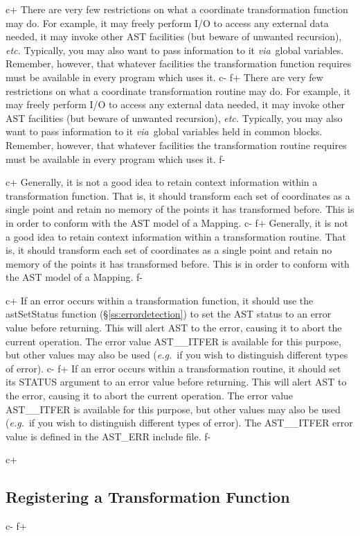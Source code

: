 \documentclass[twoside,11pt]{article}
\newcommand{\secref}[1]{\S\ref{#1}}
\newcommand{\secref}[1]{\ref{#1}}
\begin{document}
c+
There are very few restrictions on what a coordinate transformation
function may do. For example, it may freely perform I/O to access any
external data needed, it may invoke other AST facilities (but beware
of unwanted recursion), {\em{etc.}} Typically, you may also want to
pass information to it {\em{via}}\ global variables. Remember,
however, that whatever facilities the transformation function requires
must be available in every program which uses it.
c-
f+
There are very few restrictions on what a coordinate transformation
routine may do. For example, it may freely perform I/O to access any
external data needed, it may invoke other AST facilities (but beware
of unwanted recursion), {\em{etc.}} Typically, you may also want to
pass information to it {\em{via}}\ global variables held in common
blocks.  Remember, however, that whatever facilities the
transformation routine requires must be available in every program
which uses it.
f-

c+
Generally, it is not a good idea to retain context information within
a transformation function. That is, it should transform each set of
coordinates as a single point and retain no memory of the points it
has transformed before. This is in order to conform with the AST model
of a Mapping.
c-
f+
Generally, it is not a good idea to retain context information within
a transformation routine. That is, it should transform each set of
coordinates as a single point and retain no memory of the points it
has transformed before. This is in order to conform with the AST model
of a Mapping.
f-

c+
If an error occurs within a transformation function, it should use the
astSetStatus function (\secref{ss:errordetection}) to set the AST
status to an error value before returning. This will alert AST to the
error, causing it to abort the current operation. The error value
AST\_\_ITFER is available for this purpose, but other values may also
be used ({\em{e.g.}}\ if you wish to distinguish different types of
error).
c-
f+
If an error occurs within a transformation routine, it should set its
STATUS argument to an error value before returning. This will alert
AST to the error, causing it to abort the current operation. The error
value AST\_\_ITFER is available for this purpose, but other values may
also be used ({\em{e.g.}}\ if you wish to distinguish different types
of error). The AST\_\_ITFER error value is defined in the AST\_ERR
include file.
f-

c+
\subsection{\label{ss:registeringintramaps}Registering a Transformation Function}
c-
f+
\end{document}
